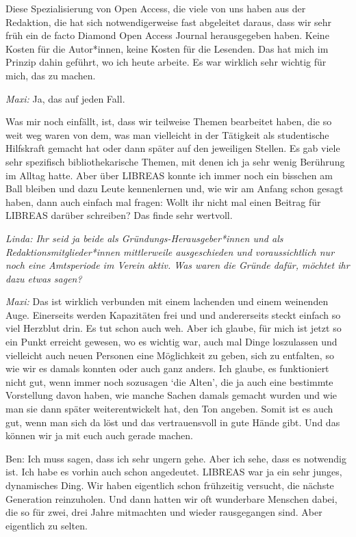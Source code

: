 \documentclass[a4paper,
fontsize=11pt,
oneside,
numbers=noperiodatend,
parskip=half-,
bibliography=totoc,
final
]{scrartcl}
\begin{document}
Diese Spezialisierung von Open Access, die viele von uns haben aus der
Redaktion, die hat sich notwendigerweise fast abgeleitet daraus, dass
wir sehr früh ein de facto Diamond Open Access Journal herausgegeben
haben. Keine Kosten für die Autor*innen, keine Kosten für die Lesenden.
Das hat mich im Prinzip dahin geführt, wo ich heute arbeite. Es war
wirklich sehr wichtig für mich, das zu machen.

\emph{Maxi:} Ja, das auf jeden Fall.

Was mir noch einfällt, ist, dass wir teilweise Themen bearbeitet haben,
die so weit weg waren von dem, was man vielleicht in der Tätigkeit als
studentische Hilfskraft gemacht hat oder dann später auf den jeweiligen
Stellen. Es gab viele sehr spezifisch bibliothekarische Themen, mit
denen ich ja sehr wenig Berührung im Alltag hatte. Aber über LIBREAS
konnte ich immer noch ein bisschen am Ball bleiben und dazu Leute
kennenlernen und, wie wir am Anfang schon gesagt haben, dann auch
einfach mal fragen: Wollt ihr nicht mal einen Beitrag für LIBREAS
darüber schreiben? Das finde sehr wertvoll.

\emph{Linda: Ihr seid ja beide als Gründungs-Herausgeber*innen und als
Redaktionsmitglieder*innen mittlerweile ausgeschieden und
voraussichtlich nur noch eine Amtsperiode im Verein aktiv. Was waren die
Gründe dafür, möchtet ihr dazu etwas sagen?}

\emph{Maxi:} Das ist wirklich verbunden mit einem lachenden und einem
weinenden Auge. Einerseits werden Kapazitäten frei und und andererseits
steckt einfach so viel Herzblut drin. Es tut schon auch weh. Aber ich
glaube, für mich ist jetzt so ein Punkt erreicht gewesen, wo es wichtig
war, auch mal Dinge loszulassen und vielleicht auch neuen Personen eine
Möglichkeit zu geben, sich zu entfalten, so wie wir es damals konnten
oder auch ganz anders. Ich glaube, es funktioniert nicht gut, wenn immer
noch sozusagen \enquote*{die Alten}, die ja auch eine bestimmte
Vorstellung davon haben, wie manche Sachen damals gemacht wurden und wie
man sie dann später weiterentwickelt hat, den Ton angeben. Somit ist es
auch gut, wenn man sich da löst und das vertrauensvoll in gute Hände
gibt. Und das können wir ja mit euch auch gerade machen.

Ben: Ich muss sagen, dass ich sehr ungern gehe. Aber ich sehe, dass es
notwendig ist. Ich habe es vorhin auch schon angedeutet. LIBREAS war ja
ein sehr junges, dynamisches Ding. Wir haben eigentlich schon frühzeitig
versucht, die nächste Generation reinzuholen. Und dann hatten wir oft
wunderbare Menschen dabei, die so für zwei, drei Jahre mitmachten und
wieder rausgegangen sind. Aber eigentlich zu selten.
\end{document}
